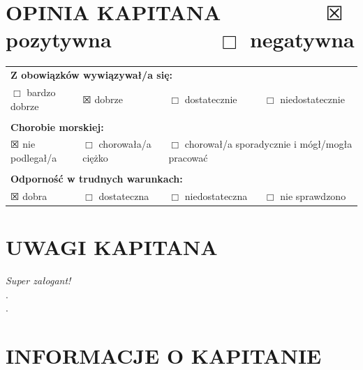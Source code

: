\documentclass{article}
\begin{document}
\section*{OPINIA KAPITANA ~~~~~~~~ $\XBox$ pozytywna ~~~~~~~~ $\Box$ negatywna}

\begin{tabularx}{\textwidth}{X X X X}
\multicolumn{4}{l}{\textbf{Z obowiązków wywiązywał/a się:}}\\
$\Box$ bardzo dobrze & $\XBox$ dobrze & $\Box$ dostatecznie & $\Box$ niedostatecznie\\
\\
\multicolumn{4}{l}{\textbf{Chorobie morskiej:}}\\
$\XBox$ nie podlegał/a & $\Box$ chorowała/a ciężko & \multicolumn{2}{l}{$\Box$ chorował/a sporadycznie i mógł/mogła pracować}\\
\\
\multicolumn{4}{l}{\textbf{Odporność w trudnych warunkach:}}\\
$\XBox$ dobra & $\Box$ dostateczna & $\Box$ niedostateczna & $\Box$ nie sprawdzono\\
\end{tabularx}

\section*{UWAGI KAPITANA}


\textit{Super załogant!}\dotfill \\
.\dotfill \\
.\dotfill \\
\section*{INFORMACJE O KAPITANIE}
\end{document}
